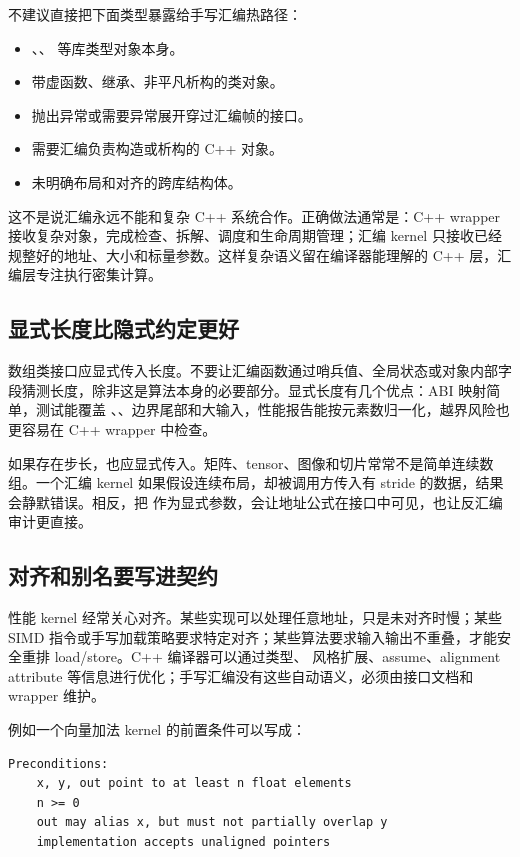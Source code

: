 不建议直接把下面类型暴露给手写汇编热路径：

\begin{itemize}
  \item {}、、 等库类型对象本身。
  \item 带虚函数、继承、非平凡析构的类对象。
  \item 抛出异常或需要异常展开穿过汇编帧的接口。
  \item 需要汇编负责构造或析构的 C++ 对象。
  \item 未明确布局和对齐的跨库结构体。
\end{itemize}

这不是说汇编永远不能和复杂 C++ 系统合作。正确做法通常是：C++ wrapper 接收复杂对象，完成检查、拆解、调度和生命周期管理；汇编 kernel 只接收已经规整好的地址、大小和标量参数。这样复杂语义留在编译器能理解的 C++ 层，汇编层专注执行密集计算。

\subsection{显式长度比隐式约定更好}

数组类接口应显式传入长度。不要让汇编函数通过哨兵值、全局状态或对象内部字段猜测长度，除非这是算法本身的必要部分。显式长度有几个优点：ABI 映射简单，测试能覆盖 、、边界尾部和大输入，性能报告能按元素数归一化，越界风险也更容易在 C++ wrapper 中检查。

如果存在步长，也应显式传入。矩阵、tensor、图像和切片常常不是简单连续数组。一个汇编 kernel 如果假设连续布局，却被调用方传入有 stride 的数据，结果会静默错误。相反，把  作为显式参数，会让地址公式在接口中可见，也让反汇编审计更直接。

\subsection{对齐和别名要写进契约}

性能 kernel 经常关心对齐。某些实现可以处理任意地址，只是未对齐时慢；某些 SIMD 指令或手写加载策略要求特定对齐；某些算法要求输入输出不重叠，才能安全重排 load/store。C++ 编译器可以通过类型、 风格扩展、assume、alignment attribute 等信息进行优化；手写汇编没有这些自动语义，必须由接口文档和 wrapper 维护。

例如一个向量加法 kernel 的前置条件可以写成：

\begin{lstlisting}
Preconditions:
    x, y, out point to at least n float elements
    n >= 0
    out may alias x, but must not partially overlap y
    implementation accepts unaligned pointers
\end{lstlisting}


